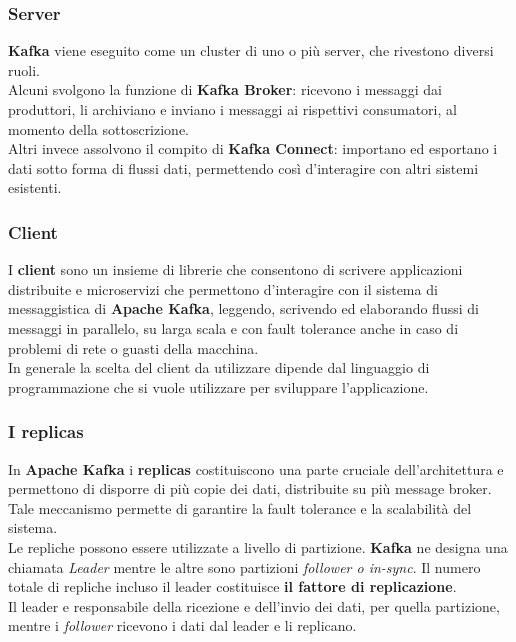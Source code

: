 \subsubsection{Server}
\textbf{Kafka} viene eseguito come un cluster di uno o più server, che rivestono diversi ruoli. \\Alcuni svolgono la funzione di \textbf{Kafka Broker}: ricevono i messaggi dai produttori, li archiviano e inviano i messaggi ai rispettivi consumatori, al momento della sottoscrizione.
\\ Altri invece assolvono il compito di \textbf{Kafka Connect}: importano ed esportano i
dati sotto forma di flussi dati, permettendo così  d'interagire con altri sistemi esistenti.
\subsubsection{Client}
I \textbf{client} sono un insieme di librerie che consentono di scrivere applicazioni distribuite e microservizi che permettono d'interagire con
il sistema di messaggistica di \textbf{Apache Kafka}, leggendo, scrivendo ed elaborando flussi di messaggi in parallelo, su larga scala e con \gls{fault tolerance}{} anche in caso di
problemi di rete o guasti della macchina.\\
In generale la scelta del client da utilizzare dipende dal linguaggio di programmazione che si vuole utilizzare per sviluppare l'applicazione.
\subsubsection{I replicas}
In \textbf{Apache Kafka} i \textbf{replicas} costituiscono una parte cruciale dell'architettura e permettono di disporre  di più copie dei dati, distribuite su
più \gls{message broker}{}. Tale meccanismo permette di garantire la \gls{fault tolerance}{} e la scalabilità del sistema.\\
Le repliche possono essere utilizzate a livello di partizione. \textbf{Kafka} ne designa una chiamata \textit{Leader}
mentre le altre sono partizioni \textit{follower o in-sync}. Il numero totale di repliche incluso il
leader costituisce \textbf{il fattore di replicazione}. \\
Il leader e responsabile della ricezione e dell’invio
dei dati, per quella partizione, mentre i \textit{follower} ricevono i dati dal leader e li replicano.\\
